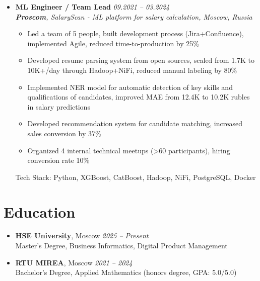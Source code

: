 \documentclass[letterpaper,11pt]{article}
\begin{document}
\begin{itemize}[leftmargin=0.15in, label={}]
    \item \textbf{ML Engineer / Team Lead} \hfill \textit{09.2021 -- 03.2024} \\
    \textit{\textbf{Proscom}, SalaryScan - ML platform for salary calculation, Moscow, Russia} \\
    \vspace{-10pt}
    \begin{itemize}
        \item Led a team of 5 people, built development process (Jira+Confluence), implemented Agile, reduced time-to-production by 25\%
        \item Developed resume parsing system from open sources, scaled from 1.7K to 10K+/day through Hadoop+NiFi, reduced manual labeling by 80\%
        \item Implemented NER model for automatic detection of key skills and qualifications of candidates, improved MAE from 12.4K to 10.2K rubles in salary predictions
        \item Developed recommendation system for candidate matching, increased sales conversion by 37\%
        \item Organized 4 internal technical meetups (>60 participants), hiring conversion rate 10\%
    \end{itemize}
    \vspace{-10pt}
    Tech Stack: Python, XGBoost, CatBoost, Hadoop, NiFi, PostgreSQL, Docker
    \vspace{-17pt}
\end{itemize}

\section{Education}

\begin{itemize}[leftmargin=0.15in, label={}]
    \item \textbf{HSE University}, Moscow \hfill \textit{2025 -- Present} \\
    Master's Degree, Business Informatics, Digital Product Management
    \vspace{-10pt}
    
    \item \textbf{RTU MIREA}, Moscow \hfill \textit{2021 -- 2024} \\
    Bachelor's Degree, Applied Mathematics (honors degree, GPA: 5.0/5.0)
    \vspace{-17pt}
\end{itemize}
\end{document}
